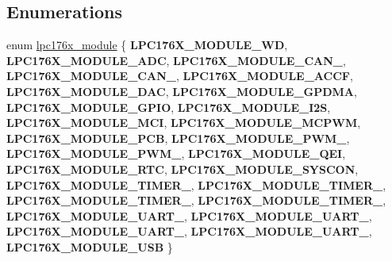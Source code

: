 \subsection*{Enumerations}
\begin{DoxyCompactItemize}
\item 
enum \mbox{\hyperlink{common-types_8h_a7183a9a227854e33c20d9153adf747cb}{lpc176x\+\_\+module}} \{ \newline
{\bfseries L\+P\+C176\+X\+\_\+\+M\+O\+D\+U\+L\+E\+\_\+\+WD}, 
{\bfseries L\+P\+C176\+X\+\_\+\+M\+O\+D\+U\+L\+E\+\_\+\+A\+DC}, 
{\bfseries L\+P\+C176\+X\+\_\+\+M\+O\+D\+U\+L\+E\+\_\+\+C\+A\+N\+\_}, 
{\bfseries L\+P\+C176\+X\+\_\+\+M\+O\+D\+U\+L\+E\+\_\+\+C\+A\+N\+\_}, 
\newline
{\bfseries L\+P\+C176\+X\+\_\+\+M\+O\+D\+U\+L\+E\+\_\+\+A\+C\+CF}, 
{\bfseries L\+P\+C176\+X\+\_\+\+M\+O\+D\+U\+L\+E\+\_\+\+D\+AC}, 
{\bfseries L\+P\+C176\+X\+\_\+\+M\+O\+D\+U\+L\+E\+\_\+\+G\+P\+D\+MA}, 
{\bfseries L\+P\+C176\+X\+\_\+\+M\+O\+D\+U\+L\+E\+\_\+\+G\+P\+IO}, 
\newline
{\bfseries L\+P\+C176\+X\+\_\+\+M\+O\+D\+U\+L\+E\+\_\+\+I2S}, 
{\bfseries L\+P\+C176\+X\+\_\+\+M\+O\+D\+U\+L\+E\+\_\+\+M\+CI}, 
{\bfseries L\+P\+C176\+X\+\_\+\+M\+O\+D\+U\+L\+E\+\_\+\+M\+C\+P\+WM}, 
{\bfseries L\+P\+C176\+X\+\_\+\+M\+O\+D\+U\+L\+E\+\_\+\+P\+CB}, 
\newline
{\bfseries L\+P\+C176\+X\+\_\+\+M\+O\+D\+U\+L\+E\+\_\+\+P\+W\+M\+\_}, 
{\bfseries L\+P\+C176\+X\+\_\+\+M\+O\+D\+U\+L\+E\+\_\+\+P\+W\+M\+\_}, 
{\bfseries L\+P\+C176\+X\+\_\+\+M\+O\+D\+U\+L\+E\+\_\+\+Q\+EI}, 
{\bfseries L\+P\+C176\+X\+\_\+\+M\+O\+D\+U\+L\+E\+\_\+\+R\+TC}, 
\newline
{\bfseries L\+P\+C176\+X\+\_\+\+M\+O\+D\+U\+L\+E\+\_\+\+S\+Y\+S\+C\+ON}, 
{\bfseries L\+P\+C176\+X\+\_\+\+M\+O\+D\+U\+L\+E\+\_\+\+T\+I\+M\+E\+R\+\_}, 
{\bfseries L\+P\+C176\+X\+\_\+\+M\+O\+D\+U\+L\+E\+\_\+\+T\+I\+M\+E\+R\+\_}, 
{\bfseries L\+P\+C176\+X\+\_\+\+M\+O\+D\+U\+L\+E\+\_\+\+T\+I\+M\+E\+R\+\_}, 
\newline
{\bfseries L\+P\+C176\+X\+\_\+\+M\+O\+D\+U\+L\+E\+\_\+\+T\+I\+M\+E\+R\+\_}, 
{\bfseries L\+P\+C176\+X\+\_\+\+M\+O\+D\+U\+L\+E\+\_\+\+U\+A\+R\+T\+\_}, 
{\bfseries L\+P\+C176\+X\+\_\+\+M\+O\+D\+U\+L\+E\+\_\+\+U\+A\+R\+T\+\_}, 
{\bfseries L\+P\+C176\+X\+\_\+\+M\+O\+D\+U\+L\+E\+\_\+\+U\+A\+R\+T\+\_}, 
\newline
{\bfseries L\+P\+C176\+X\+\_\+\+M\+O\+D\+U\+L\+E\+\_\+\+U\+A\+R\+T\+\_}, 
{\bfseries L\+P\+C176\+X\+\_\+\+M\+O\+D\+U\+L\+E\+\_\+\+U\+SB}
 \}

\end{DoxyCompactItemize}
